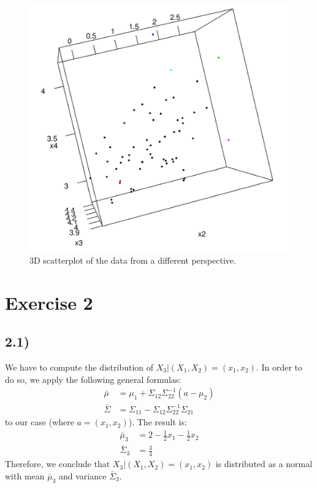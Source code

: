 \documentclass[a4paper,11pt,oneside]{report}
\begin{document}
	\begin{figure}[H]
	\centering
	\includegraphics[scale = 0.68]{3dplot2.png}
	\caption{3D scatterplot of the data from a different perspective.}
	\label{img:3Dscatter2}
	\end{figure}

\newpage
\section*{Exercise 2}
\subsection*{2.1)}
	We have to compute the distribution of $X_3|(X_1, X_2) = (x_1, x_2)$.
	In order to do so, we apply the following general formulas:
	\begin{align}
		\bar \mu &= \mu_1 + \Sigma_{12} \Sigma_{22}^{-1}(a - \mu_2) \label{eq:cond_mean} \\
		\bar \Sigma &= \Sigma_{11} - \Sigma_{12} \Sigma_{22}^{-1} \Sigma_{21} \label{eq:cond_Sigma}
	\end{align}
	to our case (where $a = (x_1, x_2)$). The result is:
	\begin{align}
		\bar \mu_3 &= 2 - \frac{1}{2}x_1 - \frac{1}{2}x_2 \nonumber \\
		\bar \Sigma_3 &= \frac{3}{4} \nonumber
	\end{align}
	Therefore, we conclude that $X_3|(X_1, X_2) = (x_1, x_2)$ is distributed as a normal with mean $\bar \mu_3$ and variance $\bar \Sigma_3$.
	
\end{document}
